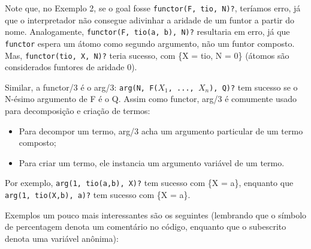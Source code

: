 \documentclass{article}
\theoremstyle{remark}
\theoremstyle{theorem}
\begin{document}
Note que, no Exemplo 2, se o goal fosse {\tt functor(F, tio, N)?}, teríamos erro, já que o interpretador não consegue adivinhar a aridade de um funtor a partir do nome. Analogamente, %
{\tt functor(F, tio(a, b), N)?} resultaria em erro, já que {\tt functor} espera um átomo como segundo argumento, não um funtor composto. Mas, {\tt functor(tio, X, N)?} teria sucesso, com \{X = tio, N = 0\} (átomos são considerados funtores de aridade 0).

Similar, a functor/3 é o arg/3: {\tt arg(N, F($X_1$, ..., $X_n$), Q)?} tem sucesso se o N-ésimo argumento de F é o Q. Assim como functor, arg/3 é comumente usado para decomposição e criação de termos:
\begin{itemize}
  \item Para decompor um termo, arg/3 acha um argumento particular de um termo composto;
  \item Para criar um termo, ele instancia um argumento variável de um termo.
\end{itemize}

Por exemplo, {\tt arg(1, tio(a,b), X)?} tem sucesso com \{X = a\}, enquanto que {\tt arg(1, tio(X,b), a)?} tem sucesso com \{X = a\}.

Exemplos um pouco mais interessantes são os seguintes (lembrando que o símbolo de percentagem denota um comentário no código, enquanto que o subescrito denota uma variável anônima): %




\end{document}
